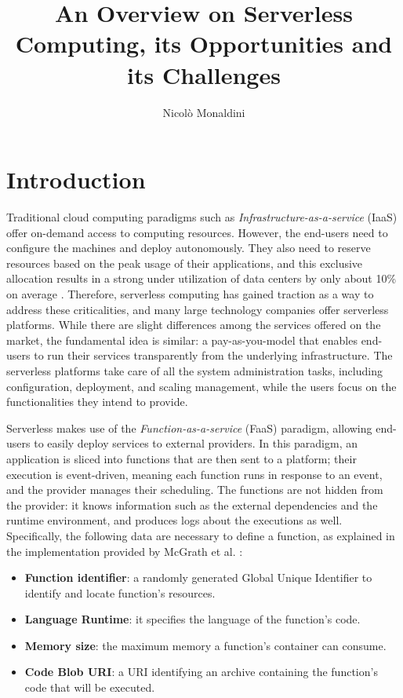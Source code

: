 \documentclass[
	a4paper, %
	12pt,
	twoside, %
]{LTJournalArticle}
\title{An Overview on Serverless Computing, its Opportunities and its Challenges} %
\author{%
	Nicolò Monaldini
}
\begin{document}
\maketitle %


\section{Introduction}
\label{sec:introduction}

Traditional cloud computing paradigms such as \textit{Infrastructure-as-a-service} (IaaS) offer on-demand access to computing resources. However, the end-users need to configure the machines and deploy autonomously. They also need to reserve resources based on the peak usage of their applications, and this exclusive allocation results in a strong under utilization of data centers by only about 10\% on average \cite{li_serverless_2022}. Therefore, serverless computing has gained traction as a way to address these criticalities, and many large technology companies offer serverless platforms. While there are slight differences among the services offered on the market, the fundamental idea is similar: a pay-as-you-model that enables end-users to run their services transparently from the underlying infrastructure. The serverless platforms take care of all the system administration tasks, including configuration, deployment, and scaling management, while the users focus on the functionalities they intend to provide.

Serverless makes use of the \textit{Function-as-a-service} (FaaS) paradigm, allowing end-users to easily deploy services to external providers. In this paradigm, an application is sliced into functions that are then sent to a platform; their execution is event-driven, meaning each function runs in response to an event, and the provider manages their scheduling. The functions are not hidden from the provider: it knows information such as the external dependencies and the runtime environment, and produces logs about the executions as well. Specifically, the following data are necessary to define a function, as explained in the implementation provided by McGrath et al. \cite{mcgrath_serverless_2017}:

\begin{itemize}
	\item \textbf{Function identifier}: a randomly generated Global Unique Identifier to identify and locate function's resources.
	\item \textbf{Language Runtime}: it specifies the language of the function's code.
	\item \textbf{Memory size}: the maximum memory a function's container can consume.
	\item \textbf{Code Blob URI}: a URI identifying an archive containing the function's code that will be executed.
\end{itemize}
\end{document}
